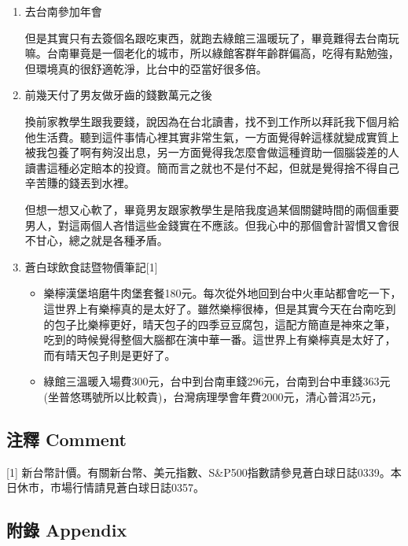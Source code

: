 \documentclass[
]{article}
\providecommand{\tightlist}{%
  \setlength{\itemsep}{0pt}\setlength{\parskip}{0pt}}
\begin{document}
\begin{enumerate}
\def\labelenumi{\arabic{enumi}.}
\item
  去台南參加年會

  但是其實只有去簽個名跟吃東西，就跑去綠館三溫暖玩了，畢竟難得去台南玩嘛。台南畢竟是一個老化的城市，所以綠館客群年齡群偏高，吃得有點勉強，但環境真的很舒適乾淨，比台中的亞當好很多倍。
\item
  前幾天付了男友做牙齒的錢數萬元之後

  換前家教學生跟我要錢，說因為在台北讀書，找不到工作所以拜託我下個月給他生活費。聽到這件事情心裡其實非常生氣，一方面覺得幹這樣就變成實質上被我包養了啊有夠沒出息，另一方面覺得我怎麼會做這種資助一個腦袋差的人讀書這種必定賠本的投資。簡而言之就也不是付不起，但就是覺得捨不得自己辛苦賺的錢丟到水裡。

  但想一想又心軟了，畢竟男友跟家教學生是陪我度過某個關鍵時間的兩個重要男人，對這兩個人吝惜這些金錢實在不應該。但我心中的那個會計習慣又會很不甘心，總之就是各種矛盾。
\item
  蒼白球飲食誌暨物價筆記{[}1{]}

  \begin{itemize}
  \tightlist
  \item
    樂檸漢堡培磨牛肉堡套餐180元。每次從外地回到台中火車站都會吃一下，這世界上有樂檸真的是太好了。雖然樂檸很棒，但是其實今天在台南吃到的包子比樂檸更好，晴天包子的四季豆豆腐包，這配方簡直是神來之筆，吃到的時候覺得整個大腦都在演中華一番。這世界上有樂檸真是太好了，而有晴天包子則是更好了。
  \item
    綠館三溫暖入場費300元，台中到台南車錢296元，台南到台中車錢363元(坐普悠瑪號所以比較貴)，台灣病理學會年費2000元，清心普洱25元，
  \end{itemize}
\end{enumerate}

\hypertarget{ux6ce8ux91cb-comment-19}{%
\subsection{注釋 Comment}\label{ux6ce8ux91cb-comment-19}}

{[}1{]}
新台幣計價。有關新台幣、美元指數、S\&P500指數請參見蒼白球日誌0339。本日休市，市場行情請見蒼白球日誌0357。

\hypertarget{ux9644ux9304-appendix-19}{%
\subsection{附錄 Appendix}\label{ux9644ux9304-appendix-19}}
\end{document}
